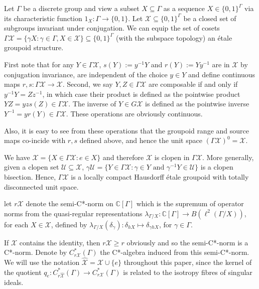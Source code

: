 \documentclass[a4paper, 12pt]{amsart}
\theoremstyle{definition}
\theoremstyle{remark}
\numberwithin{equation}{section}
\begin{document}
 Let $\Gamma$ be a discrete group and view a subset $X\subseteq \Gamma$ as a sequence $X\in \{0,1\}^{\Gamma}$ via its characteristic function $1_{X}:\Gamma\to \{0,1\}$. Let $\mathcal{X}\subseteq \{0,1\}^{\Gamma}$ be a closed set of subgroups invariant under conjugation. We can equip the set of cosets $\Gamma\mathcal{X} = \{\gamma X:\gamma\in \Gamma, X\in\mathcal{X}\}\subseteq \{0,1\}^{\Gamma}$ (with the subspace topology) an \'etale groupoid structure. 

First note that for any $Y\in \Gamma\mathcal{X}$, $s(Y):= y^{-1}Y$ and $r(Y):= Yy^{-1}$ are in $\mathcal{X}$ by conjugation invariance, are independent of the choice $y\in Y$ and define continuous maps $r,s:\Gamma\mathcal{X}\to \mathcal{X}$. Second,  we say $Y, Z\in \Gamma\mathcal{X}$ are composable if and only if $y^{-1}Y = Zz^{-1}$, in which case their product is defined as the pointwise product $YZ = yzs(Z)\in \Gamma\mathcal{X}$. The inverse of $Y\in G\mathcal{X}$ is defined as the pointwise inverse $Y^{-1} = yr(Y)\in \Gamma\mathcal{X}$. These operations are obviously continuous.

Also, it is easy to see from these operations that the groupoid range and source maps co-incide with $r,s$ defined above, and hence the unit space $(\Gamma\mathcal{X})^{0} = \mathcal{X}$.

We have $\mathcal{X}= \{X\in \Gamma\mathcal{X}: e\in X\}$ and therefore $\mathcal{X}$ is clopen in $\Gamma\mathcal{X}$. More generally, given a clopen set $\mathcal{U}\subseteq \mathcal{X}$, $\gamma\mathcal{U} = \{Y\in \Gamma\mathcal{X}: \gamma\in Y\text{ and } \gamma^{-1}Y\in \mathcal{U}\}$ is a clopen bisection. Hence, $\Gamma\mathcal{X}$ is a locally compact Hausdorff \'etale groupoid with totally disconnected unit space.

let $r\mathcal{X}$ denote the semi-C*-norm on $\mathbb{C}[\Gamma]$ which is the supremum of operator norms from the quasi-regular representations $\lambda_{\Gamma/X}:\mathbb{C}[\Gamma]\to B(\ell^{2}(\Gamma/X))$, for each $X\in\mathcal{X}$, defined by $\lambda_{\Gamma/X}(\delta_{\gamma}):\delta_{hX}\mapsto \delta_{\gamma hX}$, for $\gamma\in\Gamma$.

If $\mathcal{X}$ contains the identity, then $r\mathcal{X}\geq r$ obviously and so the semi-C*-norm is a C*-norm. Denote by $C^{*}_{r\mathcal{X}}(\Gamma)$ the C*-algebra induced from this semi-C*-norm. We will use the notation $\hat{\mathcal{X}} = \mathcal{X}\cup\{e\}$ throughout this paper, since the kernel of the quotient $q_{e}:C^{*}_{r\hat{\mathcal{X}}}(\Gamma)\to C^{*}_{r\mathcal{X}}(\Gamma)$ is related to the isotropy fibres of singular ideals.
  
\end{document}
